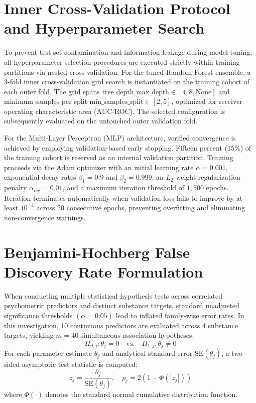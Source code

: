\documentclass[conference]{IEEEtran}
\begin{document}
\appendices

\section{Inner Cross-Validation Protocol and Hyperparameter Search}
To prevent test set contamination and information leakage during model tuning, all hyperparameter selection procedures are executed strictly within training partitions via nested cross-validation. For the tuned Random Forest ensemble, a 3-fold inner cross-validation grid search is instantiated on the training cohort of each outer fold. The grid spans tree depth $\text{max\_depth} \in [4, 8, \text{None}]$ and minimum samples per split $\text{min\_samples\_split} \in [2, 5]$, optimized for receiver operating characteristic area (AUC-ROC). The selected configuration is subsequently evaluated on the untouched outer validation fold.

For the Multi-Layer Perceptron (MLP) architecture, verified convergence is achieved by employing validation-based early stopping. Fifteen percent ($15\%$) of the training cohort is reserved as an internal validation partition. Training proceeds via the Adam optimizer with an initial learning rate $\alpha = 0.001$, exponential decay rates $\beta_1 = 0.9$ and $\beta_2 = 0.999$, an $L_2$ weight regularization penalty $\alpha_{\text{reg}} = 0.01$, and a maximum iteration threshold of $1,500$ epochs. Iteration terminates automatically when validation loss fails to improve by at least $10^{-4}$ across 20 consecutive epochs, preventing overfitting and eliminating non-convergence warnings.

\section{Benjamini-Hochberg False Discovery Rate Formulation}
When conducting multiple statistical hypothesis tests across correlated psychometric predictors and distinct substance targets, standard unadjusted significance thresholds $(\alpha = 0.05)$ lead to inflated family-wise error rates. In this investigation, 10 continuous predictors are evaluated across 4 substance targets, yielding $m = 40$ simultaneous association hypotheses:
\begin{equation}
H_{0, j}: \theta_j = 0 \quad \text{vs.} \quad H_{1, j}: \theta_j \neq 0
\end{equation}
For each parameter estimate $\theta_j$ and analytical standard error $\text{SE}(\theta_j)$, a two-sided asymptotic test statistic is computed:
\begin{equation}
z_j = \frac{\theta_j}{\text{SE}(\theta_j)}, \quad p_j = 2 \left( 1 - \Phi(|z_j|) \right)
\end{equation}
where $\Phi(\cdot)$ denotes the standard normal cumulative distribution function.
\end{document}
